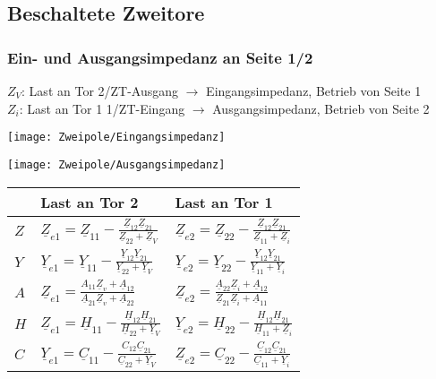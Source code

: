 \subsection{Beschaltete Zweitore}
\subsubsection{Ein- und Ausgangsimpedanz an Seite 1/2}
{\footnotesize $Z_V$: Last an Tor 2/ZT-Ausgang $\rightarrow$ Eingangsimpedanz, Betrieb von Seite 1\\ $Z_i$: Last an Tor 1 1/ZT-Eingang $\rightarrow$ Ausgangsimpedanz, Betrieb von Seite 2}\\
\setlength{\parindent}{0pt}
\begin{minipage}{0.5\columnwidth}
\texttt{[image: Zweipole/Eingangsimpedanz]}
\end{minipage}
\begin{minipage}{0.5\columnwidth}
	\texttt{[image: Zweipole/Ausgangsimpedanz]}
\end{minipage}
	\renewcommand{\arraystretch}{1.8}
\begin{tabularx}{\columnwidth}{|X|l|l|}

	\hline  & Last an Tor 2 & Last an Tor 1 \\
	\hline$Z$ & $ \underline{Z}_{e1} =  \underline{Z}_{11}-\frac{\underline{Z}_{12} \underline{Z}_{21}}{\underline{Z}_{22}+\underline{Z}_{V}}$ & $\underline{Z}_{e 2}=\underline{Z}_{22}-\frac{\underline{Z}_{12} \underline{Z}_{21}}{\underline{Z}_{11}+\underline{Z}_{i}}$ \\
	\hline
	$Y$ & $\underline{Y}_{e 1}=\underline{Y}_{11}-\frac{\underline{Y}_{12} \underline{Y}_{21}}{\underline{Y}_{22}+\underline{Y}_{V}}$ & $\underline{Y}_{e 2}=\underline{Y}_{22}-\frac{\underline{Y}_{12} \underline{Y}_{21}}{\underline{Y}_{11}+\underline{Y}_{i}}$ \\
	\hline
	$A$ & $\underline{Z}_{e 1}=\frac{A_{11} \underline{Z}_{v}+\underline{A}_{12}}{\underline{A}_{21} \underline{Z}_{v}+\underline{A}_{22}}$ & $\underline{Z}_{e 2}=\frac{\underline{A}_{22} \underline{Z}_{i}+\underline{A}_{12}}{\underline{Z}_{21} \underline{Z}_{i}+\underline{A}_{11}}$ \\
	\hline
	$H$ & $\underline{Z}_{e 1}=\underline{H}_{11}-\frac{\underline{H}_{12} \underline{H}_{21}}{\underline{H}_{22}+\underline{Y}_{V}}$ & $\underline{Y}_{e 2}=\underline{H}_{22}-\frac{\underline{H}_{12} \underline{H}_{21}}{\underline{H}_{11}+\underline{Z}_{i}}$ \\
	\hline
	$C$ & $\underline{Y}_{e1}=\underline{C}_{11}-\frac{C_{12} \underline{C}_{21}}{\underline{C}_{22}+\underline{Y}_{V}}$ & $\underline{Z}_{e 2}=\underline{C}_{22}-\frac{\underline{C}_{12} \underline{C}_{21}}{\underline{C}_{11}+\underline{Y}_{i}}$ \\
	\hline
\end{tabularx}

